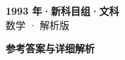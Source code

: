 \documentclass[zihao=-4, a4paper]{ctexart}
\begin{document}
\begin{center}
  {\Large\bfseries 1993 年·新科目组·文科}\\[4pt]
  {\large 数学 · 解析版}
\end{center}
\medskip
{}

\clearpage
{}
\begin{center}{\Large\bfseries 参考答案与详细解析}\end{center}
\medskip

\end{document}
